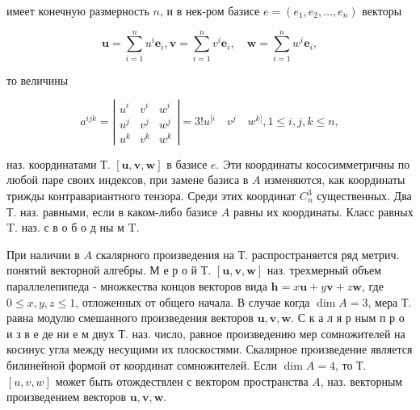 \documentclass[10pt]{article}
\begin{document}
имеет конечную размерность $n$, и в нек-ром базисе $e=\left(e_{1}, e_{2}, \ldots, e_{n}\right)$ векторы



\[

\boldsymbol{u}=\sum_{i=1}^{n} u^{i} \boldsymbol{e}_{i}, \boldsymbol{v}=\sum_{i=1}^{n} v^{i} \boldsymbol{e}_{i}, \quad \boldsymbol{w}=\sum_{i=1}^{n} w^{i} \boldsymbol{e}_{i},

\]



то величины



\[

a^{i j k}=\left|\begin{array}{ccc}

u^{i} & v^{i} & w^{i} \\

u^{j} & v^{j} & w^{j} \\

u^{k} & v^{k} & w^{k}

\end{array}\right|=3 ! u^{[i} \quad v^{j} \quad w^{k]}, 1 \leqslant i, j, k \leqslant n,

\]



наз. координатами Т. $[\boldsymbol{u}, \boldsymbol{v}, \boldsymbol{w}]$ в базисе $e$. Эти координаты кососимметричны по любой паре своих индексов, при замене базиса в $A$ изменяются, как координаты трижды контравариантного тензора. Среди этих координат $C_{n}^{3}$ существенных. Два Т. наз. равными, если в каком-либо базисе $A$ равны их координаты. Класс равных T. наз. с в о б о д ны м T.



При наличии в $A$ скалярного произведения на Т. распространяется ряд метрич. понятий векторной алгебры. М е р о й Т. $[\boldsymbol{u}, \boldsymbol{v}, \boldsymbol{w}]$ наз. трехмерный объем параллелепипеда - множкества концов векторов вида $\boldsymbol{h}=x \boldsymbol{u}+y \boldsymbol{v}+z \boldsymbol{w}$, где $0 \leqslant x, y, z \leqslant 1$, отложенных от общего начала. В случае когда $\operatorname{dim} A=3$, мера Т. равна модулю смешанного произведения векторов $\boldsymbol{u}, \boldsymbol{v}, \boldsymbol{w}$. С к а л я р ным п р о и з в е де ни е м двух Т. наз. число, равное произведению мер сомножителей на косинус угла между несущими их плоскостями. Скалярное произведение является билинейной формой от координат сомножителей. Если $\operatorname{dim} A=4$, то Т. $[u, v, w]$ может быть отождествлен с вектором пространства $A$, наз. векторным произведением векторов $\boldsymbol{u}, \boldsymbol{v}, \boldsymbol{w}$.
\end{document}
